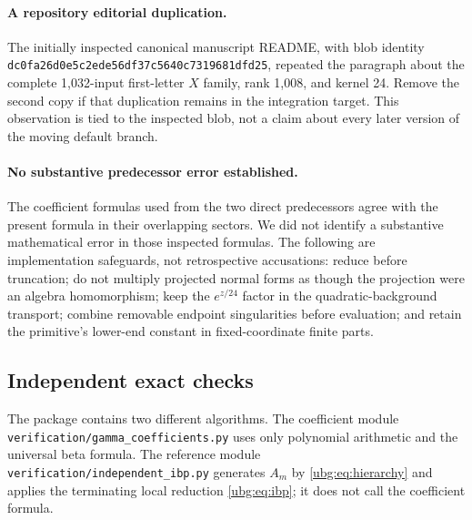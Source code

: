 \documentclass[11pt,letterpaper]{article}
\numberwithin{equation}{section}
\theoremstyle{definition}\newtheorem{definition}[theorem]{Definition}
\theoremstyle{remark}\newtheorem{remark}[theorem]{Remark}
\newcommand{\src}[1]{\nolinkurl{#1}}
\begin{document}
\paragraph{A repository editorial duplication.}
The initially inspected canonical manuscript README, with blob identity
\src{dc0fa26d0e5c2ede56df37c5640c7319681dfd25}, repeated the paragraph
about the complete 1,032-input first-letter $X$ family, rank 1,008,
and kernel 24. Remove the second copy if that duplication remains in
the integration target. This observation is tied to the inspected blob,
not a claim about every later version of the moving default branch.

\paragraph{No substantive predecessor error established.}
The coefficient formulas used from the two direct predecessors agree
with the present formula in their overlapping sectors. We did not
identify a substantive mathematical error in those inspected formulas.
The following are implementation safeguards, not retrospective
accusations: reduce before truncation; do not multiply projected
normal forms as though the projection were an algebra homomorphism;
keep the $e^{z/24}$ factor in the quadratic-background transport;
combine removable endpoint singularities before evaluation; and retain
the primitive's lower-end constant in fixed-coordinate finite parts.

\subsection{Independent exact checks}
The package contains two different algorithms. The coefficient module
\src{verification/gamma_coefficients.py} uses only polynomial arithmetic
and the universal beta formula. The reference module
\src{verification/independent_ibp.py} generates $A_m$ by
\eqref{ubg:eq:hierarchy} and applies the terminating local reduction
\eqref{ubg:eq:ibp}; it does not call the coefficient formula.
\end{document}
